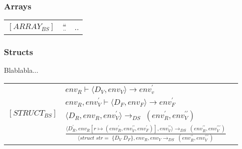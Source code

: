     
\noindent \subsubsection{Arrays}


    
\begin{semantik}
    \bgroup
    \def\arraystretch{3}
    \begin{table}[H]
    \centering
    \begin{tabular}{l c l}
        
        $[ARRAY_{BS}]$ & $
        \frac{..}
        {..}
        $ & .. \\
        
    \end{tabular}
    \end{table}
    \egroup
    \caption{Array}
    \label{sem:arrayvalue}
\end{semantik}
    
\noindent \subsubsection{Structs}
Blablabla... 





\begin{semantik}
    \bgroup
    \def\arraystretch{2}
    \begin{table}[H]
    \centering
    \begin{tabular}{l c l}
        
        \multirow{4}{*}{$[STRUCT_{BS}]$} &
        \multicolumn{1}{l}{$ env_R \vdash \langle D_V, env_V \rangle \rightarrow env_v^\prime$} \\
        
        & \multicolumn{1}{l}{$ env_R, env_V^\prime \vdash \langle D_F, env_F \rangle \rightarrow env_F^\prime $} \\
        
        & \multicolumn{1}{l}{$ \langle D_R, env_R, env_V^\prime \rangle \rightarrow_{DS}\;(env_R^\prime, env_V^{\prime\prime}) $} \\
        
        
        & \multicolumn{1}{l}{$ \frac
            {
              \langle D_R^\prime, env_R[r \mapsto (env_R^\prime, env_V^{\prime\prime}, env_F^\prime)], env_V^{\prime\prime} \rangle                                       \rightarrow_{DS}\;(env_R^{\prime\prime}, env_V^{\prime\prime\prime})
            }
            {
                \langle struct\;str =\;\{ D_V\;D_F \}, env_R, env_V \rightarrow_{DS}\;(env_R^{\prime\prime}, env_V^{\prime\prime\prime})
            } 
        $}
        
    \end{tabular}
    
    \end{table}
    \egroup
    \caption{Structs}
\label{sem:structs}
\end{semantik}

